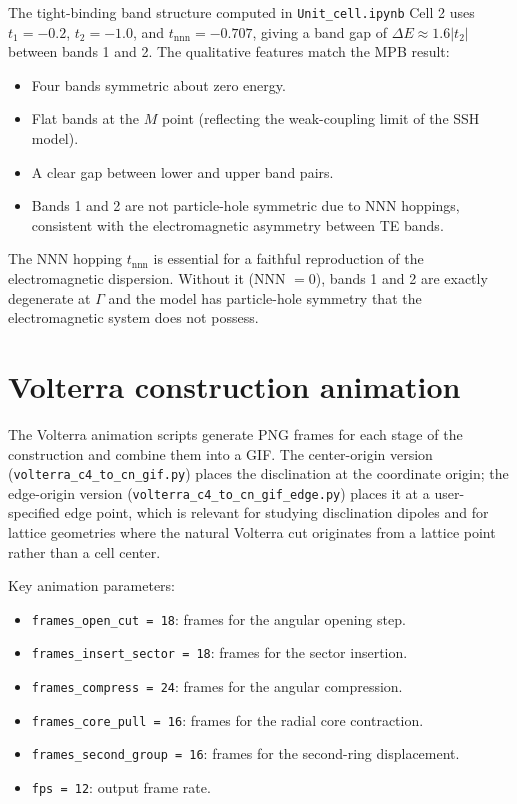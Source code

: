 \documentclass[12pt,a4paper,oneside]{book}
\theoremstyle{plain}
\theoremstyle{definition}
\theoremstyle{remark}
\begin{document}
The tight-binding band structure computed in \texttt{Unit\_cell.ipynb} Cell 2 uses $t_1 = -0.2$, $t_2 = -1.0$, and $t_\mathrm{nnn} = -0.707$, giving a band gap of $\Delta E \approx 1.6|t_2|$ between bands 1 and 2. The qualitative features match the MPB result:

\begin{itemize}
  \item Four bands symmetric about zero energy.
  \item Flat bands at the $M$ point (reflecting the weak-coupling limit of the SSH model).
  \item A clear gap between lower and upper band pairs.
  \item Bands 1 and 2 are not particle-hole symmetric due to NNN hoppings, consistent with the electromagnetic asymmetry between TE bands.
\end{itemize}

The NNN hopping $t_\mathrm{nnn}$ is essential for a faithful reproduction of the electromagnetic dispersion. Without it (NNN $= 0$), bands 1 and 2 are exactly degenerate at $\Gamma$ and the model has particle-hole symmetry that the electromagnetic system does not possess.

\section{Volterra construction animation}
\label{sec:volterra-animation}

The Volterra animation scripts generate PNG frames for each stage of the construction and combine them into a GIF. The center-origin version (\texttt{volterra\_c4\_to\_cn\_gif.py}) places the disclination at the coordinate origin; the edge-origin version (\texttt{volterra\_c4\_to\_cn\_gif\_edge.py}) places it at a user-specified edge point, which is relevant for studying disclination dipoles and for lattice geometries where the natural Volterra cut originates from a lattice point rather than a cell center.

Key animation parameters:
\begin{itemize}
  \item \texttt{frames\_open\_cut = 18}: frames for the angular opening step.
  \item \texttt{frames\_insert\_sector = 18}: frames for the sector insertion.
  \item \texttt{frames\_compress = 24}: frames for the angular compression.
  \item \texttt{frames\_core\_pull = 16}: frames for the radial core contraction.
  \item \texttt{frames\_second\_group = 16}: frames for the second-ring displacement.
  \item \texttt{fps = 12}: output frame rate.
\end{itemize}
\end{document}
